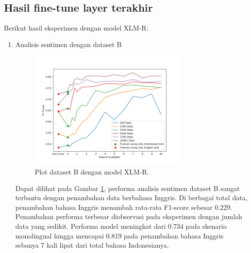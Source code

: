     \subsection{Hasil fine-tune layer terakhir}
        Berikut hasil eksperimen dengan model XLM-R: 
        \begin{enumerate}
            \item Analisis sentimen dengan dataset B \\
            \begin{figure}[ht]
                \centering
                \includegraphics[width=0.75\textwidth]{resources/plot-head-prosa-xlmr.png}
                \caption{Plot dataset B dengan model XLM-R.}
                \label{fig:plot_head_prosa_xlmr}
            \end{figure}
            Dapat dilihat pada Gambar \ref{fig:plot_head_prosa_xlmr}, performa analisis sentimen dataset B sangat terbantu dengan penambahan data berbahasa Inggris. Di berbagai total data, penambahan bahasa Inggris menambah rata-rata F1-score sebesar 0.229. Penambahan performa terbesar diobservasi pada eksperimen dengan jumlah data yang sedikit. Performa model meningkat dari 0.734 pada skenario monolingual hingga mencapai 0.819 pada penambahan bahasa Inggris sebanya 7 kali lipat dari total bahasa Indonesianya.


\end{enumerate}
